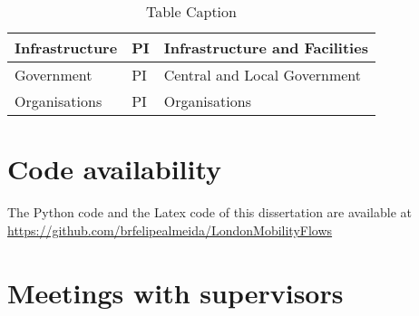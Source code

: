 \begin{table}[H]
\begin{tabular}{lll}
Infrastructure                                                     & PI                                    & Infrastructure and Facilities                                                                                                                                                                                                                                                              \\ \hline
Government                                                         & PI                                    & Central and Local Government                                                                                                                                                                                                                                                               \\ \hline
Organisations                                                      & PI                                    & Organisations                                                                                                                                                                                                                                                                              \\ \hline
\end{tabular}
\caption{Table Caption}
\end{table}

\chapter{Code availability}
\label{appendices2}

    The Python code and the Latex code of this dissertation are available at \href{https://github.com/brfelipealmeida/LondonMobilityFlows}{https://github.com/brfelipealmeida/LondonMobilityFlows}
    
\chapter{Meetings with supervisors}
\label{appendices3}

